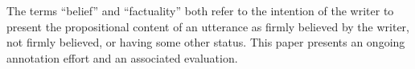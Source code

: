 The terms ``belief'' and ``factuality'' both refer to the intention of the writer to present the propositional content of an utterance as firmly believed by the writer, not firmly believed, or having some other status. This paper presents an ongoing annotation effort and an associated evaluation.
